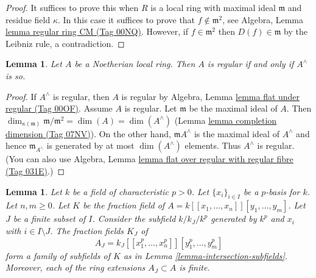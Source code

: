 \documentclass{amsart}
\theoremstyle{plain}
\newtheorem{lemma}[subsection]{Lemma}
\theoremstyle{definition}
\theoremstyle{remark}
\numberwithin{equation}{subsection}
\begin{document}
\begin{proof}
It suffices to prove this when $R$ is a local ring with maximal ideal
$\mathfrak m$ and residue field $\kappa$. In this case it suffices
to prove that $f \not \in \mathfrak m^2$, see
Algebra, Lemma \href{https://stacks.math.columbia.edu/tag/00NQ}{lemma regular ring CM (Tag 00NQ)}.
However, if $f \in \mathfrak m^2$ then $D(f) \in \mathfrak m$
by the Leibniz rule, a contradiction.
\end{proof}


\begin{lemma}
\label{lemma-completion-regular}
Let $A$ be a Noetherian local ring.
Then $A$ is regular if and only if $A^\wedge$ is so.
\end{lemma}

\begin{proof}
If $A^\wedge$ is regular, then $A$ is regular by
Algebra, Lemma \href{https://stacks.math.columbia.edu/tag/00OF}{lemma flat under regular (Tag 00OF)}.
Assume $A$ is regular. Let $\mathfrak m$ be the maximal ideal
of $A$. Then $\dim_{\kappa(\mathfrak m)} \mathfrak m/\mathfrak m^2 =
\dim(A) = \dim(A^\wedge)$ (Lemma \href{https://stacks.math.columbia.edu/tag/07NV}{lemma completion dimension (Tag 07NV)}).
On the other hand, $\mathfrak mA^\wedge$ is the maximal ideal of
$A^\wedge$ and hence $\mathfrak m_{A^\wedge}$
is generated by at most $\dim(A^\wedge)$ elements. Thus $A^\wedge$ is regular.
(You can also use
Algebra, Lemma \href{https://stacks.math.columbia.edu/tag/031E}{lemma flat over regular with regular fibre (Tag 031E)}.)
\end{proof}


\begin{lemma}
\label{lemma-power-series-ring-subfields}
Let $k$ be a field of characteristic $p > 0$. Let $\{x_i\}_{i \in I}$
be a $p$-basis for $k$. Let $n, m \geq 0$.
Let $K$ be the fraction field of $A = k[[x_1, \ldots, x_n]][y_1, \ldots, y_m]$.
Let $J$ be a finite subset of $I$. Consider the subfield
$k/k_J/k^p$ generated by $k^p$ and $x_i$ with $i \in I \setminus J$.
The fraction fields $K_J$ of
$$
A_J = k_J[[x_1^p, \ldots, x_n^p]][y_1^p, \ldots, y_m^p]
$$
form a family of subfields of $K$ as in
Lemma \ref{lemma-intersection-subfields}. Moreover, each of the ring extensions
$A_J \subset A$ is finite.
\end{lemma}
\end{document}
